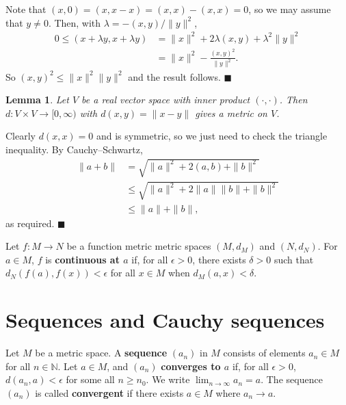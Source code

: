 \documentclass[letter-paper]{tufte-book}
\newtheorem{lemma}[theorem]{\color{pastel-blue}Lemma}
\newenvironment{proof}[1][Proof]{\begin{trivlist}
\item[\hskip \labelsep {\bfseries #1}]}{\end{trivlist}}
\newcommand{\qed}{\hfill$\blacksquare$}
\begin{document}
\begin{proof}
  Note that $(x, 0) = (x, x - x) = (x, x) - (x, x) =
  0$, so we may assume that $y \neq 0$. Then, with
  $\lambda = -(x, y) / \|y\|^2$,
  \begin{align*}
    0 \leq (x + \lambda y, x + \lambda y) 
      & = \| x \|^2 + 2\lambda(x, y) + \lambda^2 \| y \|^2\\
      & = \| x \|^2 - \frac{(x, y)^2}{\| y \|^2}.
  \end{align*}
  So $(x, y)^2 \leq \| x \|^2 \| y \|^2$ and the result follows. \qed
\end{proof}

\begin{lemma}
  Let $V$ be a real vector space with inner product $(\cdot, \cdot)$. Then $d: V
  \times V \to [0, \infty)$ with $d(x, y) = \| x - y\|$ gives a metric on $V$.
\end{lemma}

\begin{proof}
  Clearly $d(x, x) = 0$ and is symmetric, so we just need to check the triangle
  inequality. By Cauchy--Schwartz,
  \begin{align*}
    \| a + b\| &= \sqrt{\|a\|^2 + 2(a, b) + \| b\|^2} \\
      &\leq \sqrt{\|a\|^2 + 2\|a\| \|b\| + \| b\|^2} \\
      &\leq \|a\| + \|b\|,
  \end{align*}
  as required. \qed
\end{proof}

Let $f: M \to N$ be a function metric metric spaces $(M, d_M)$ and $(N, d_N)$.
For $a \in M$, $f$ is \textbf{continuous at $a$} if, for all $\epsilon > 0$,
there exists $\delta >0$ such that $d_N(f(a), f(x)) < \epsilon$ for all $x\in M$
when $d_M(a, x) < \delta$.


\section{Sequences and Cauchy sequences}

Let $M$ be a metric space. A \textbf{sequence} $(a_n)$ in $M$ consists of
elements $a_n \in M$ for all $n\in\mathbb{N}$. Let $a \in M$, and $(a_n)$
\textbf{converges to $a$} if, for all $\epsilon > 0$, $d(a_n, a) < \epsilon$
for some all $n \geq n_0$. We write $\lim_{n\to\infty} a_n = a$. The sequence
$(a_n)$ is called \textbf{convergent} if there exists $a\in M$ where $a_n \to
a$.
\end{document}
